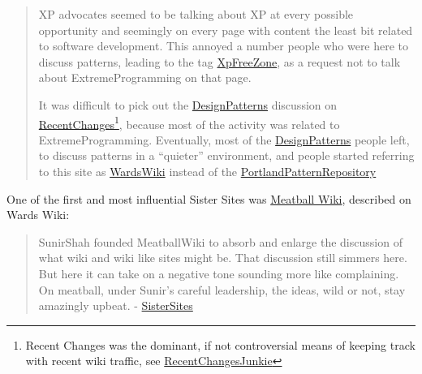 \documentclass[10pt]{article}
\begin{document}
\begin{multicols}{2}
\begin{quote}
XP advocates seemed to be talking about XP at every possible opportunity
and seemingly on every page with content the least bit related to
software development. This annoyed a number people who were here to
discuss patterns, leading to the tag
\href{http://wiki.c2.com/?XpFreeZone}{XpFreeZone}, as a request not to
talk about ExtremeProgramming on that page.

It was difficult to pick out the
\href{http://wiki.c2.com/?DesignPatterns}{DesignPatterns} discussion on
\href{http://wiki.c2.com/?RecentChanges}{RecentChanges}\footnote{Recent
  Changes was the dominant, if not controversial means of keeping track
  with recent wiki traffic, see
  \href{http://wiki.c2.com/?RecentChangesJunkie}{RecentChangesJunkie}},
because most of the activity was related to ExtremeProgramming.
Eventually, most of the
\href{http://wiki.c2.com/?DesignPatterns}{DesignPatterns} people left,
to discuss patterns in a ``quieter'' environment, and people started
referring to this site as
\href{http://wiki.c2.com/?WardsWiki}{WardsWiki} instead of the
\href{http://wiki.c2.com/?PortlandPatternRepository}{PortlandPatternRepository}
\cite{C2wikiWikiHistory} 
\end{quote}

One of the first and most influential Sister Sites was
\href{http://meatballwiki.org/}{Meatball Wiki}, described on Wards Wiki:

\begin{quote}
SunirShah founded MeatballWiki to absorb and enlarge the discussion of
what wiki and wiki like sites might be. That discussion still simmers
here. But here it can take on a negative tone sounding more like
complaining. On meatball, under Sunir's careful leadership, the ideas,
wild or not, stay amazingly upbeat. -
\href{http://wiki.c2.com/?SisterSites}{SisterSites}
\end{quote}


\end{multicols}
\end{document}
